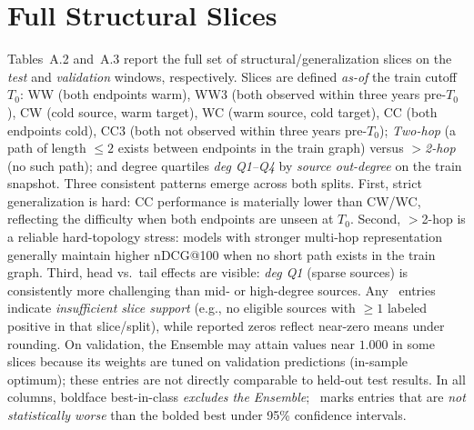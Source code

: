 \section{Full Structural Slices}
\label{app:a2-struct-test}
\noindent
Tables~A.2 and~A.3 report the full set of structural/generalization slices on the \textit{test} and \textit{validation} windows, respectively. Slices are defined \emph{as-of} the train cutoff $T_0$: WW (both endpoints warm), WW3 (both observed within three years pre-$T_0$), CW (cold source, warm target), WC (warm source, cold target), CC (both endpoints cold), CC3 (both not observed within three years pre-$T_0$); \textit{Two-hop} (a path of length $\leq 2$ exists between endpoints in the train graph) versus \textit{$>$2-hop} (no such path); and degree quartiles \textit{deg Q1--Q4} by \emph{source out-degree} on the train snapshot. Three consistent patterns emerge across both splits. First, strict generalization is hard: CC performance is materially lower than CW/WC, reflecting the difficulty when both endpoints are unseen at $T_0$. Second, $>$2-hop is a reliable hard-topology stress: models with stronger multi-hop representation generally maintain higher nDCG@100 when no short path exists in the train graph. Third, head vs.\ tail effects are visible: \textit{deg Q1} (sparse sources) is consistently more challenging than mid- or high-degree sources. Any \NA\ entries indicate \emph{insufficient slice support} (e.g., no eligible sources with $\geq 1$ labeled positive in that slice/split), while reported zeros reflect near-zero means under rounding. On validation, the Ensemble may attain values near $1.000$ in some slices because its weights are tuned on validation predictions (in-sample optimum); these entries are not directly comparable to held-out test results. In all columns, boldface best-in-class \emph{excludes the Ensemble}; \textdagger\ marks entries that are \emph{not statistically worse} than the bolded best under 95\% confidence intervals.

